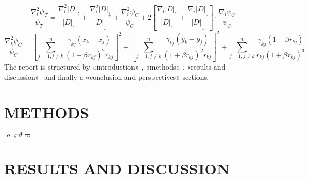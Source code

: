 \documentclass[11pt,english,a4paper]{article}
\begin{document}
\[
\frac{\nabla_i^2 \psi_T}{\psi_T} = \frac{\nabla_i^2 |D|_\uparrow}{|D|_\uparrow} + \frac{\nabla_i^2 |D|_\downarrow}{|D|_\downarrow} + \frac{\nabla_i^2 \psi_C}{\psi_C} + 2 \left[ \frac{\nabla_i |D|_\uparrow}{|D|_\uparrow} + \frac{\nabla_i |D|_\downarrow}{|D|_\downarrow} \right] \cdot \frac{\nabla_i \psi_C }{ \psi_C }
\]
\[
\frac{\nabla^2_k \psi_C}{\psi_C} = \left[ \sum_{j=1, j \neq k}^n \frac{\gamma_{kj}(x_k-x_j) }{(1 + \beta r_{kj})^2 r_{kj}} \right]^2 + \left[ \sum_{j=1, j \neq k}^n \frac{\gamma_{kj}(y_k-y_j) }{(1 + \beta r_{kj})^2 r_{kj}} \right]^2 + \sum_{j=1, j \neq k}^n \frac{\gamma_{kj}(1 - \beta r_{kj}) }{r_{kj} (1 + \beta r_{kj})^3}
\]
The report is structured by «introduction»-, «methods»-, «results and discussion»- and finally a «conclusion and perspectives»-sections.
\section*{\uppercase{Methods}}
$\varrho \varsigma \vartheta \varpi$
\section*{\uppercase{Results and discussion}}
\end{document}
